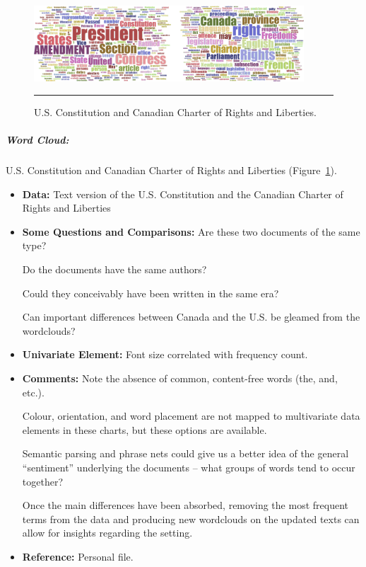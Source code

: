 \newpage
\begin{figure}[t]
\centering
\includegraphics[width=0.9\textwidth]{Images/wordclouds.png}
\caption[\small Word Cloud: U.S. Constitution and Canadian Charter of Rights and Liberties ]{\small U.S. Constitution and Canadian Charter of Rights and Liberties.} \hrule\label{fig:ex_wc_UC}
\end{figure}
\afterpage{\FloatBarrier}
\subparagraph{Word Cloud:} U.S. Constitution and Canadian Charter of Rights and Liberties (Figure~\ref{fig:ex_wc_UC}).
\begin{itemize}[noitemsep]
\item \textbf{Data:} Text version of the U.S. Constitution and the Canadian Charter of Rights and Liberties 
\item \textbf{Some Questions and Comparisons:} Are these two documents of the same type? \par Do the documents have the same authors? \par Could they conceivably have been written in the same era? \par Can important differences between Canada and the U.S. be gleamed from the wordclouds? 
\item \textbf{Univariate Element:} Font size correlated with frequency count.    
\item \textbf{Comments:} Note the absence of common, content-free words (the, and, etc.). \par Colour, orientation, and word placement are not mapped to multivariate data elements in these charts, but these options are available. \par Semantic parsing and phrase nets could give us a better idea of the general ``sentiment'' underlying the documents -- what groups of words tend to occur together? \par Once the main differences have been absorbed, removing the most frequent terms from the data and producing new wordclouds on the updated texts can allow for insights regarding the setting.
\item \textbf{Reference:} Personal file.
\end{itemize}
